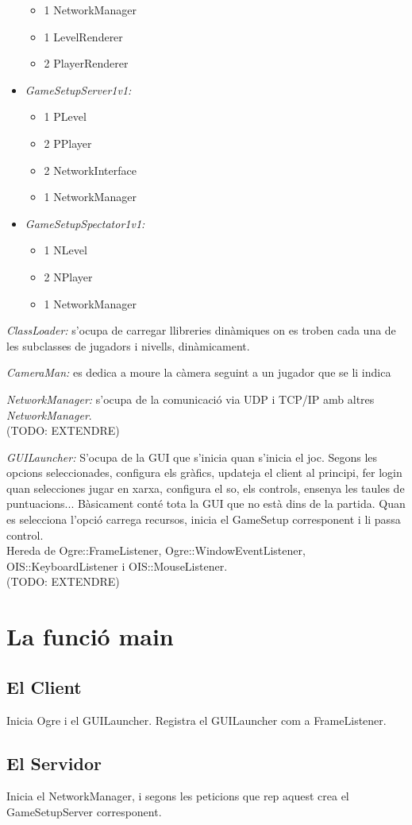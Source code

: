 \documentclass[12pt,a4paper,oneside]{article}
\begin{document}
\begin{itemize}
\begin{itemize}
\item 1 NetworkManager
\item 1 LevelRenderer
\item 2 PlayerRenderer
\end{itemize}
\item\textit{GameSetupServer1v1:}
\begin{itemize}
\item 1 PLevel
\item 2 PPlayer
\item 2 NetworkInterface
\item 1 NetworkManager
\end{itemize}
\item\textit{GameSetupSpectator1v1:}
\begin{itemize}
\item 1 NLevel
\item 2 NPlayer
\item 1 NetworkManager
\end{itemize}
\end{itemize}

\textit{ClassLoader:} s'ocupa de carregar llibreries dinàmiques on es troben cada una de les subclasses de jugadors i nivells, dinàmicament.

\textit{CameraMan:} es dedica a moure la càmera seguint a un jugador que se li indica

\textit{NetworkManager:} s'ocupa de la comunicació via UDP i TCP/IP amb altres \textit{NetworkManager}.\\ (TODO: EXTENDRE)

\textit{GUILauncher:} S'ocupa de la GUI que s'inicia quan s'inicia el joc. Segons les opcions seleccionades, configura els gràfics,  updateja el client al principi, fer login quan selecciones jugar en xarxa, configura el so, els controls, ensenya les taules de puntuacions... Bàsicament conté tota la GUI que no està dins de la partida. Quan es selecciona l'opció carrega recursos, inicia el GameSetup corresponent i li passa control.\\
Hereda de Ogre::FrameListener, Ogre::WindowEventListener, OIS::KeyboardListener i OIS::MouseListener.\\ (TODO: EXTENDRE)

\section{La funció main}
\subsection{El Client}
Inicia Ogre i el GUILauncher. Registra el GUILauncher com a FrameListener.

\subsection{El Servidor}
Inicia el NetworkManager, i segons les peticions que rep aquest crea el GameSetupServer corresponent.
\end{document}
